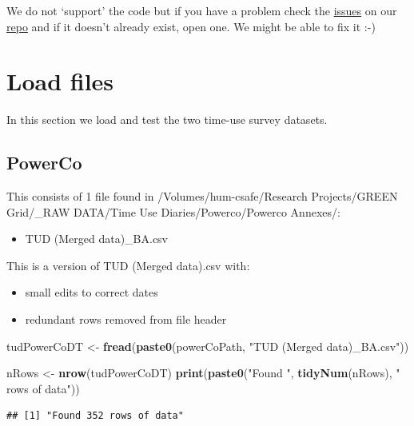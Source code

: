 \documentclass[]{article}
\newenvironment{Shaded}{\begin{snugshade}}{\end{snugshade}}
\newcommand{\KeywordTok}[1]{\textcolor[rgb]{0.13,0.29,0.53}{\textbf{#1}}}
\newcommand{\StringTok}[1]{\textcolor[rgb]{0.31,0.60,0.02}{#1}}
\newcommand{\NormalTok}[1]{#1}
\providecommand{\tightlist}{%
  \setlength{\itemsep}{0pt}\setlength{\parskip}{0pt}}
\begin{document}
We do not `support' the code but if you have a problem check the
\href{https://git.soton.ac.uk/ba1e12/nzGREENGrid/issues}{issues} on our
\href{https://git.soton.ac.uk/ba1e12/nzGREENGrid}{repo} and if it
doesn't already exist, open one. We might be able to fix it :-)

\section{Load files}\label{load-files}

In this section we load and test the two time-use survey datasets.

\subsection{PowerCo}\label{powerco}

This consists of 1 file found in /Volumes/hum-csafe/Research
Projects/GREEN Grid/\_RAW DATA/Time Use Diaries/Powerco/Powerco
Annexes/:

\begin{itemize}
\tightlist
\item
  TUD (Merged data)\_BA.csv
\end{itemize}

This is a version of TUD (Merged data).csv with:

\begin{itemize}
\tightlist
\item
  small edits to correct dates
\item
  redundant rows removed from file header
\end{itemize}

\begin{Shaded}
\begin{Highlighting}[]
\NormalTok{tudPowerCoDT <-}\StringTok{ }\KeywordTok{fread}\NormalTok{(}\KeywordTok{paste0}\NormalTok{(powerCoPath, }\StringTok{"TUD (Merged data)_BA.csv"}\NormalTok{))}

\NormalTok{nRows <-}\StringTok{ }\KeywordTok{nrow}\NormalTok{(tudPowerCoDT)}
\KeywordTok{print}\NormalTok{(}\KeywordTok{paste0}\NormalTok{(}\StringTok{"Found "}\NormalTok{, }\KeywordTok{tidyNum}\NormalTok{(nRows), }\StringTok{" rows of data"}\NormalTok{))}
\end{Highlighting}
\end{Shaded}

\begin{verbatim}
## [1] "Found 352 rows of data"
\end{verbatim}
\end{document}
